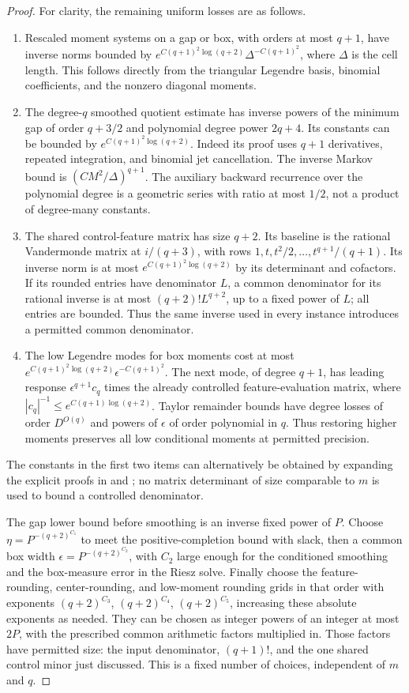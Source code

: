 \documentclass[11pt]{article}
\begin{document}
\begin{proof}
For clarity, the remaining uniform losses are as follows.
\begin{enumerate}
\item Rescaled moment systems on a gap or box, with orders at most
$q+1$, have inverse norms bounded by
$e^{C(q+1)^2\log(q+2)}\Delta^{-C(q+1)^2}$, where $\Delta$ is the
cell length. This follows directly from the triangular Legendre
basis, binomial coefficients, and the nonzero diagonal moments.
\item The degree-$q$ smoothed quotient estimate has inverse powers
of the minimum gap of order $q+3/2$ and polynomial degree power
$2q+4$. Its constants can be bounded by $e^{C(q+1)^2\log(q+2)}$.
Indeed its proof uses $q+1$ derivatives, repeated integration, and
binomial jet cancellation. The inverse Markov bound is
$(C M^2/\Delta)^{q+1}$. The auxiliary backward recurrence over the
polynomial degree is a geometric series with ratio at most $1/2$,
not a product of degree-many constants.
\item The shared control-feature matrix has size $q+2$. Its baseline
is the rational Vandermonde matrix at $i/(q+3)$, with rows
$1,t,t^2/2,\ldots,t^{q+1}/(q+1)$. Its inverse norm is at most
$e^{C(q+1)^2\log(q+2)}$ by its determinant and cofactors. If its
rounded entries have denominator $L$, a common denominator for its
rational inverse is at most $(q+2)!L^{q+2}$, up to a fixed power of
$L$; all entries are bounded. Thus the same inverse used in every
instance introduces a permitted common denominator.
\item The low Legendre modes for box moments cost at most
$e^{C(q+1)^2\log(q+2)}\epsilon^{-C(q+1)^2}$.
The next mode, of degree $q+1$, has leading response
$\epsilon^{q+1}c_q$ times the already controlled feature-evaluation
matrix, where $|c_q|^{-1}\le e^{C(q+1)\log(q+2)}$.
Taylor remainder bounds have degree losses of order $D^{O(q)}$ and
powers of $\epsilon$ of order polynomial in $q$. Thus restoring higher moments preserves all
low conditional moments at permitted precision.
\end{enumerate}
The constants in the first two items can alternatively be obtained
by expanding the explicit proofs in
 and
;
no matrix determinant of size comparable to $m$ is used to bound a
controlled denominator.

The gap lower bound before smoothing is an inverse fixed power of
$P$. Choose $\eta=P^{-(q+2)^{C_1}}$ to meet the positive-completion
bound with slack, then a common box width
$\epsilon=P^{-(q+2)^{C_2}}$, with $C_2$ large enough for the
conditioned smoothing and the box-measure error in the Riesz solve.
Finally choose the feature-rounding, center-rounding, and low-moment
rounding grids in that order with exponents $(q+2)^{C_3}$,
$(q+2)^{C_4}$, $(q+2)^{C_5}$, increasing these absolute exponents as
needed. They can be chosen as integer powers of an integer at most
$2P$, with the prescribed common arithmetic factors multiplied in.
Those factors have permitted size: the input denominator, $(q+1)!$,
and the one shared control minor just discussed. This is a fixed
number of choices, independent of $m$ and $q$.


\end{proof}
\end{document}
